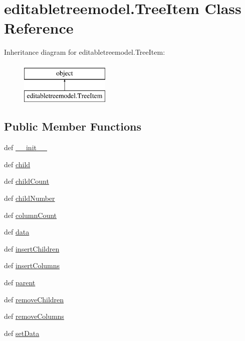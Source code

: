 \hypertarget{classeditabletreemodel_1_1TreeItem}{}\section{editabletreemodel.\+Tree\+Item Class Reference}
\label{classeditabletreemodel_1_1TreeItem}
Inheritance diagram for editabletreemodel.\+Tree\+Item\+:\begin{figure}[H]
\begin{center}
\leavevmode
\includegraphics[height=2.000000cm]{classeditabletreemodel_1_1TreeItem}
\end{center}
\end{figure}
\subsection*{Public Member Functions}
\begin{DoxyCompactItemize}
\item 
def \hyperlink{classeditabletreemodel_1_1TreeItem_a1fadffce743ade20ec1b7bad2da9474c}{\+\_\+\+\_\+init\+\_\+\+\_\+}
\item 
def \hyperlink{classeditabletreemodel_1_1TreeItem_a383859a9724cf18aaaccd10b019f9c31}{child}
\item 
def \hyperlink{classeditabletreemodel_1_1TreeItem_a23c0849fa3a597749f5129d6da3087ea}{child\+Count}
\item 
def \hyperlink{classeditabletreemodel_1_1TreeItem_a0c7edad25314997741602d1742e7740e}{child\+Number}
\item 
def \hyperlink{classeditabletreemodel_1_1TreeItem_aa2389a19592d0bd925a7c6c4ebd20501}{column\+Count}
\item 
def \hyperlink{classeditabletreemodel_1_1TreeItem_af079d95f9b8d26c3369d9faadeff1b6f}{data}
\item 
def \hyperlink{classeditabletreemodel_1_1TreeItem_aefa5dcec45bc263bc9640d46fff374e7}{insert\+Children}
\item 
def \hyperlink{classeditabletreemodel_1_1TreeItem_ac1c46b6add8a1a83f3f149735594a700}{insert\+Columns}
\item 
def \hyperlink{classeditabletreemodel_1_1TreeItem_a51ac6e41a942eb344924834a5c565b11}{parent}
\item 
def \hyperlink{classeditabletreemodel_1_1TreeItem_afbb9e0340e02341165b7bad07e4f52c8}{remove\+Children}
\item 
def \hyperlink{classeditabletreemodel_1_1TreeItem_a2e3d35bd8d0e396aad58145ea65da32a}{remove\+Columns}
\item 
def \hyperlink{classeditabletreemodel_1_1TreeItem_ad060eca944f8c1b392674c3ab4a7e6e0}{set\+Data}
\end{DoxyCompactItemize}
